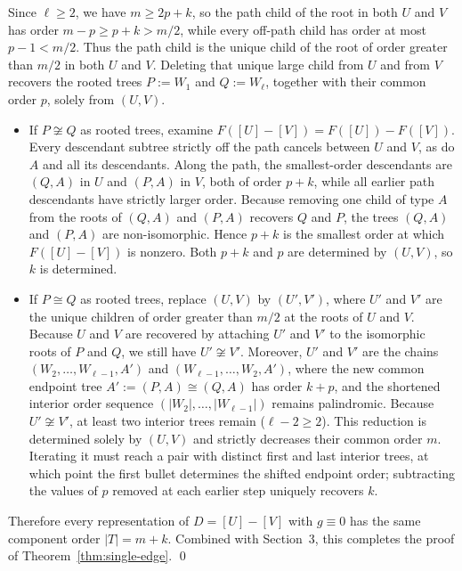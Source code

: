 \documentclass[10pt]{article}
\begin{document}
Since $\ell\ge 2$, we have $m \ge 2p+k$, so the path child of the root in both $U$ and $V$ has order $m-p \ge p+k > m/2$, while every off-path child has order at most $p-1 < m/2$. Thus the path child is the unique child of the root of order greater than $m/2$ in both $U$ and $V$. Deleting that unique large child from $U$ and from $V$ recovers the rooted trees $P := W_1$ and $Q := W_\ell$, together with their common order $p$, solely from $(U,V)$.

\begin{itemize}
\item If $P\not\cong Q$ as rooted trees, examine $F([U]-[V]) = F([U])-F([V])$. Every descendant subtree strictly off the path cancels between $U$ and $V$, as do $A$ and all its descendants. Along the path, the smallest-order descendants are $(Q,A)$ in $U$ and $(P,A)$ in $V$, both of order $p+k$, while all earlier path descendants have strictly larger order. Because removing one child of type $A$ from the roots of $(Q,A)$ and $(P,A)$ recovers $Q$ and $P$, the trees $(Q,A)$ and $(P,A)$ are non-isomorphic. Hence $p+k$ is the smallest order at which $F([U]-[V])$ is nonzero. Both $p+k$ and $p$ are determined by $(U,V)$, so $k$ is determined.

\item If $P\cong Q$ as rooted trees, replace $(U,V)$ by $(U',V')$, where $U'$ and $V'$ are the unique children of order greater than $m/2$ at the roots of $U$ and $V$. Because $U$ and $V$ are recovered by attaching $U'$ and $V'$ to the isomorphic roots of $P$ and $Q$, we still have $U'\not\cong V'$. Moreover, $U'$ and $V'$ are the chains $(W_2,\ldots,W_{\ell-1},A')$ and $(W_{\ell-1},\ldots,W_2,A')$, where the new common endpoint tree $A' := (P,A)\cong (Q,A)$ has order $k+p$, and the shortened interior order sequence $(|W_2|,\ldots,|W_{\ell-1}|)$ remains palindromic. Because $U'\not\cong V'$, at least two interior trees remain ($\ell-2\ge 2$). This reduction is determined solely by $(U,V)$ and strictly decreases their common order $m$. Iterating it must reach a pair with distinct first and last interior trees, at which point the first bullet determines the shifted endpoint order; subtracting the values of $p$ removed at each earlier step uniquely recovers $k$.
\end{itemize}

Therefore every representation of $D=[U]-[V]$ with $g\equiv 0$ has the same component order $|T|=m+k$. Combined with Section~3, this completes the proof of Theorem~\ref{thm:single-edge}. \qed
\end{document}
